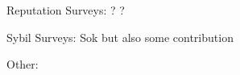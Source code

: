 Reputation Surveys:
\cite{marti2006taxonomy}
\cite{josang2007survey} ?
\cite{hoffman2009survey}
\cite{koutrouli2012taxonomy}
\cite{selvaraj2012survey} ?
\cite{hendrikx2015reputation}

Sybil Surveys:
\cite{levine2006survey}
\cite{mohaisen2013sybil}
\cite{rakesh2014survey}
\cite{gunturu2015survey}
\cite{koll2014state}
Sok\cite{alvisi2013sok} but also some contribution

Other:
\cite{wallach2003survey}


